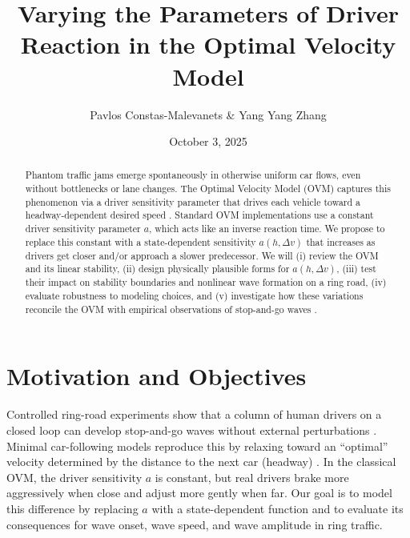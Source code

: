 \documentclass[12pt]{article}
\title{Varying the Parameters of Driver Reaction in the Optimal Velocity Model}
\author{Pavlos Constas{-}Malevanets \& Yang Yang Zhang}
\date{October 3, 2025}
\begin{document}
\maketitle

\begin{abstract}
Phantom traffic jams emerge spontaneously in otherwise uniform car flows, even without bottlenecks or lane changes. The Optimal Velocity Model (OVM) captures this phenomenon via a driver sensitivity parameter that drives each vehicle toward a headway{-}dependent desired speed \cite{Bando1995PRE,TreiberKesting2013}. Standard OVM implementations use a constant driver sensitivity parameter \(a\), which acts like an inverse reaction time. We propose to replace this constant with a state{-}dependent sensitivity \(a(h,\Delta v)\) that increases as drivers get closer and/or approach a slower predecessor. We will (i) review the OVM and its linear stability, (ii) design physically plausible forms for \(a(h,\Delta v)\), (iii) test their impact on stability boundaries and nonlinear wave formation on a ring road, (iv) evaluate robustness to modeling choices, and (v) investigate how these variations reconcile the OVM with empirical observations of stop{-}and{-}go waves \cite{Sugiyama2008NJP,NonlinearDynamics2022Modes}.
\end{abstract}

\section{Motivation and Objectives}
Controlled ring-road experiments show that a column of human drivers on a closed loop can develop stop{-}and{-}go waves without external perturbations \cite{Sugiyama2008NJP}. Minimal car{-}following models reproduce this by relaxing toward an ``optimal'' velocity determined by the distance to the next car (headway) \cite{Bando1995PRE,TreiberKesting2013}. In the classical OVM, the driver sensitivity \(a\) is constant, but real drivers brake more aggressively when close and adjust more gently when far. Our goal is to model this difference by replacing \(a\) with a state{-}dependent function and to evaluate its consequences for wave onset, wave speed, and wave amplitude in ring traffic.
\end{document}
